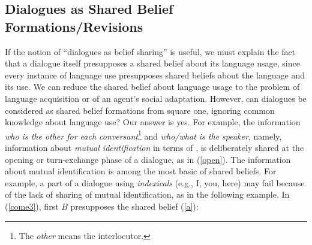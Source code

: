 \subsection{Dialogues as Shared Belief Formations/Revisions}\label{SBF}
If the notion of ``dialogues as belief sharing'' is useful,
we must explain the fact that a dialogue itself presupposes a shared belief about its language usage, since every instance of language use presupposes shared beliefs about the language and its use.
We can reduce the shared belief about language usage to the problem of language acquisition or of an agent's social adaptation.
However, can dialogues be considered as shared belief formations from square one, ignoring common knowledge about language use?
Our answer is yes.
For example, the information {\it who is the other for each conversant}\<\footnote{
The {\it other} means the interlocutor.
}
 and {\it who/what is the speaker}, namely, information about {\it
mutual identification} in terms of \cite{Ste94}, is deliberately
shared at the opening or turn-exchange phase of a dialogue, as in
(\ref{open}).
\noindent
{}
The information about mutual identification is among the most basic of shared beliefs.
For example, a part of a dialogue using {\it indexicals} (e.g., I, you, here) may fail because of the lack of sharing of mutual identification, as in the following example.
In (\ref{come3}), first $B$ presupposes the shared belief (\ref{a}):

